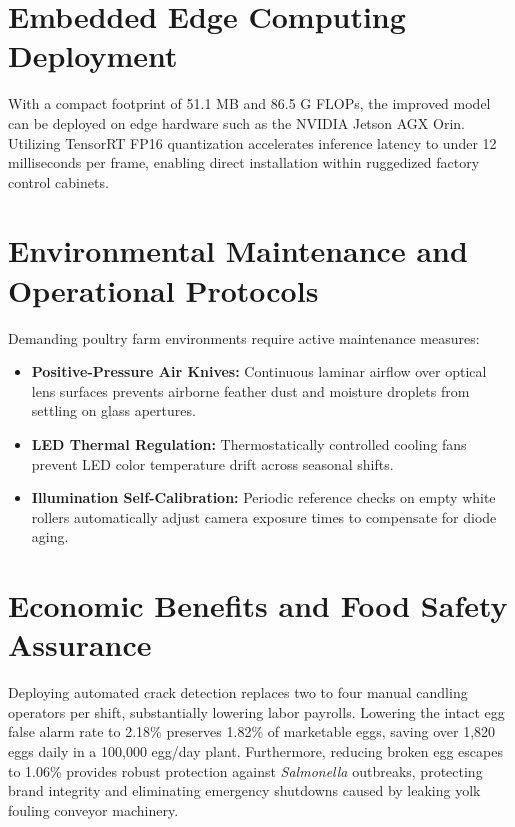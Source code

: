 \documentclass[12pt,a4paper]{report}
\begin{document}
\section{Embedded Edge Computing Deployment}

With a compact footprint of 51.1 MB and 86.5 G FLOPs, the improved model can be deployed on edge hardware such as the NVIDIA Jetson AGX Orin. Utilizing TensorRT FP16 quantization accelerates inference latency to under 12 milliseconds per frame, enabling direct installation within ruggedized factory control cabinets.

\section{Environmental Maintenance and Operational Protocols}

Demanding poultry farm environments require active maintenance measures:
\begin{itemize}
    \item \textbf{Positive-Pressure Air Knives:} Continuous laminar airflow over optical lens surfaces prevents airborne feather dust and moisture droplets from settling on glass apertures.
    \item \textbf{LED Thermal Regulation:} Thermostatically controlled cooling fans prevent LED color temperature drift across seasonal shifts.
    \item \textbf{Illumination Self-Calibration:} Periodic reference checks on empty white rollers automatically adjust camera exposure times to compensate for diode aging.
\end{itemize}

\section{Economic Benefits and Food Safety Assurance}

Deploying automated crack detection replaces two to four manual candling operators per shift, substantially lowering labor payrolls. Lowering the intact egg false alarm rate to 2.18\% preserves 1.82\% of marketable eggs, saving over 1,820 eggs daily in a 100,000 egg/day plant. Furthermore, reducing broken egg escapes to 1.06\% provides robust protection against \textit{Salmonella} outbreaks, protecting brand integrity and eliminating emergency shutdowns caused by leaking yolk fouling conveyor machinery.
\end{document}
